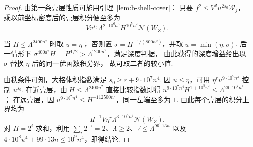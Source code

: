 \begin{proof}
由第一条壳层性质可施用引理~\ref{lem:b-shell-cover}：
只要 $f^2\le V^2 u^{2s_0}\mathcal W_j$，乘以前坐标密度后的壳层积分便至多为
\[
 V u^{s_0}\Lambda^{2\cdot10^6n^3}H^{10^5n^2}\mathcal N(W_Z).
\]

当 $H\le\Lambda^{2400n^2}$ 时取 $u=\eta$；
否则置 $\sigma=H^{-1/(800n^2)}$，并取 $u=\min(\eta,\sigma)$.
后一情形下 $\sigma^{400n^2}H=H^{1/2}>\Lambda^{1200n^2}$，满足深度判据，
由此获得的深度增益给出以 $\sigma$ 替换 $\eta$ 后的同一优函数积分界，
故可取二者的较小值.

由秩条件可知，大格体积指数满足 $s_0\ge r+9\cdot10^7n^4$.
因 $u\le\eta$，可用 $\eta^r u^{9\cdot10^7n^4}$ 控制 $u^{s_0}$.
在近壳层，由 $H\le\Lambda^{2400n^2}$ 直接比较指数即得 $u^{9\cdot10^7n^4}H^{1+10^5n^2}\le
\Lambda^{29\cdot10^7n^4}$；
在远壳层，因 $u^{9\cdot10^7n^4}\le H^{-112500n^2}$，同一左端至多为 $1$.
由此每个壳层的积分上界均为
\[
 H^{-1}V\eta^r\Lambda^{3\cdot10^8n^4}\mathcal N(W_Z).
\]
对 $H=2^i$ 求和，利用 $\sum_i 2^{-i}=2$、$\Lambda\ge2$、$V\le\Lambda^{99\cdot13n}$ 以及
$4\cdot10^8n^4+99\cdot13n\le10^9n^4$，即得结论.
\end{proof}

